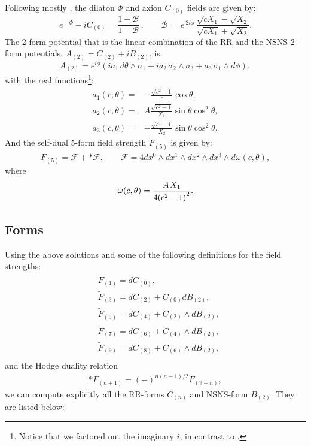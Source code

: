 Following mostly \cite{Pilch:2003jg}, the dilaton $\Phi$ and axion $C_{(0)}$ fields are given by:
\begin{equation}
 e\,^{-\Phi }-i C_{(0)} =\frac{1+\mathcal{B}}{1-\mathcal{B}}\,,
 \qquad
 \mathcal{B}=\,e\,^{2i\phi }\,\frac{\sqrt{cX_1}-\sqrt{X_2}}{\sqrt{cX_1}+\sqrt{X_2}}.
\end{equation}
The 2-form potential that is the linear combination of the RR and the NSNS 2-form potentials, $A_{(2)}=C_{(2)}+i B_{(2)}$, is:
\begin{equation}
 A_{(2)} = e^{i \phi}\left(i a_1 \, d\theta \wedge \sigma_1 + i a_2 \, \sigma_2 \wedge \sigma_3 + a_3\, \sigma_1 \wedge d\phi\right),
\end{equation}
with the real functions\footnote{Notice that we factored out the imaginary $i$, in contrast to \cite{Pilch:2003jg}.}:
\begin{align}
a_1(c,\theta) = & - \frac{\sqrt{c^2-1}}{c}\cos\theta,\nonumber\\
a_2(c,\theta) =  & A  \frac{\sqrt{c^2-1}}{X_1}\sin \theta \cos^2 \theta,\nonumber\\
a_3(c,\theta) =  &  -\frac{\sqrt{c^2-1}}{X_2}\sin \theta \cos^2 \theta.
\end{align}
And the self-dual 5-form field strength $\tilde{F}_{(5)}$ is given by:
\begin{equation}
\tilde{F}_{(5)} = \mathcal{F} + *\mathcal{F},
\qquad
\mathcal{F} = 4 d{x^0} \wedge d{x^1} \wedge d{x^2} \wedge d{x^3} \wedge d\omega(c,\theta),
\end{equation}
where 
\begin{equation}
\omega(c,\theta) = \frac{{A{\kern 1pt} {X_1}}}{{4{{\left( {{c^2} - 1} \right)}^2}}}.
\end{equation}


\subsection{Forms}

Using the above solutions and some of the following definitions for the field strengths:
\begin{align}\label{eq:defs2}
&\tilde F_{(1)} = d C_{(0)},\nonumber\\
&\tilde F_{(3)} = d C_{(2)} + C_{(0)} d B_{(2)},\nonumber\\
&\tilde F_{(5)} = d C_{(4)} + C_{(2)} \wedge d B_{(2)},\nonumber\\
&\tilde F_{(7)} = d C_{(6)} + C_{(4)} \wedge d B_{(2)},\nonumber\\
&\tilde F_{(9)} = d C_{(8)} + C_{(6)} \wedge d B_{(2)},\nonumber\\
\end{align}
and the Hodge duality relation
\begin{align}\label{eq:dualityconstraint}
\ast \tilde F_{(n+1)} =(-)^{n(n-1)/2} \tilde F_{(9-n)},
\end{align}
we can compute explicitly all the RR-forms $C_{(n)}$ and NSNS-form $B_{(2)}$. They are listed below:


